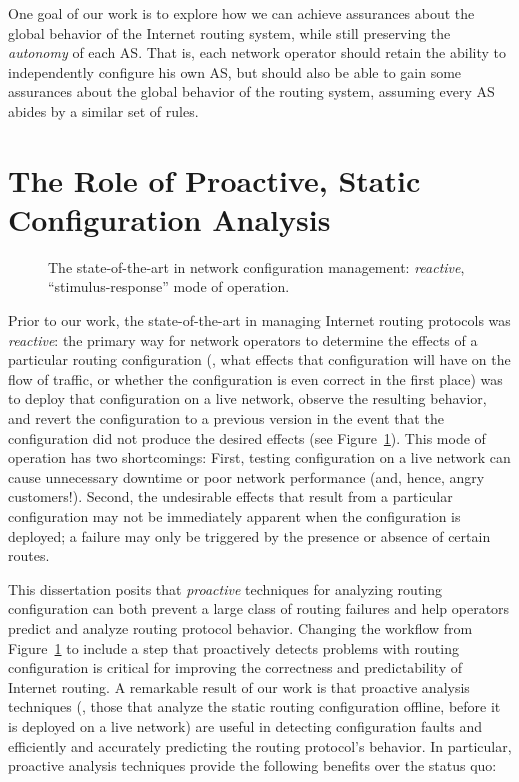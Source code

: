 One goal of our work is to explore how we can achieve assurances about
the global behavior of the Internet routing system, while still
preserving the {\em autonomy} of each AS.  That is, each network operator
should retain the ability to independently configure his own AS,
but should also be able to gain some assurances about the global behavior of
the routing system, assuming every AS abides by a similar set of
rules.  




\section{The Role of Proactive, Static Configuration
Analysis}\label{sec:proactive}  

\begin{figure}[t]
\centering{}
\caption[The state-of-the-art in network configuration management]{The state-of-the-art in network configuration management: {\em
reactive}, ``stimulus-response'' mode of operation.}
\label{fig:intro:workflow}
\end{figure}

Prior to our work, the state-of-the-art in managing Internet routing
protocols was {\em reactive}: the primary way for network operators to
determine the effects of a particular routing configuration (\ie, what
effects that configuration will have on the flow of traffic, or whether
the configuration is even correct in the first place) was to deploy that
configuration on a live network, observe the resulting behavior, and
revert the configuration to a previous version in the event that the
configuration did not produce the desired effects (see
Figure~\ref{fig:intro:workflow}).  This mode of operation has two
shortcomings: First, testing configuration on a live network can cause
unnecessary downtime or poor network performance (and, hence, angry
customers!).  Second, the undesirable effects that result from a
particular configuration may not be immediately apparent when the
configuration is deployed; a failure may only be triggered by the
presence or absence of certain routes.

This dissertation posits that {\em proactive} techniques for analyzing
routing configuration can both prevent a large class of routing failures
and help operators predict and analyze routing protocol behavior.
Changing the workflow from Figure~\ref{fig:intro:workflow} to include a
step that proactively detects problems with routing configuration is
critical for improving the correctness and predictability of Internet
routing.  A remarkable result of our work is that proactive analysis
techniques (\ie, those that analyze the static routing configuration
offline, before it is deployed on a live network) are useful in
detecting configuration faults and efficiently and accurately predicting
the routing protocol's behavior.  In particular, proactive analysis
techniques provide the following benefits over the status quo:

